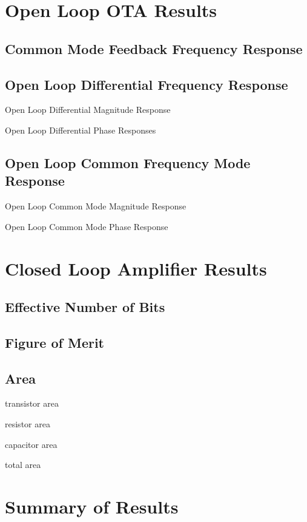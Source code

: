 \documentclass[journal]{IEEEtran}
\begin{document}
\section{Open Loop OTA Results}
\subsection{Common Mode Feedback Frequency Response}

\subsection{Open Loop Differential Frequency Response}

Open Loop Differential Magnitude Response 

Open Loop Differential Phase Responses

\subsection{Open Loop Common Frequency Mode Response}

Open Loop Common Mode Magnitude Response

Open Loop Common Mode Phase Response


\section{Closed Loop Amplifier Results}



\subsection{Effective Number of Bits}

\subsection{Figure of Merit}

\subsection{Area}
transistor area

resistor area

capacitor area

total area

\section{Summary of Results}
\end{document}
